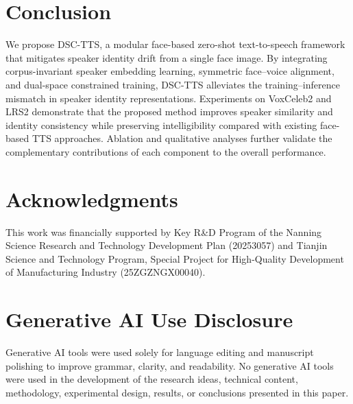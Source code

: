 \documentclass[cameraready]{Interspeech}
\begin{document}
\section{Conclusion}

We propose DSC-TTS, a modular face-based zero-shot text-to-speech framework that mitigates speaker identity drift from a single face image. By integrating corpus-invariant speaker embedding learning, symmetric face--voice alignment, and dual-space constrained training, DSC-TTS alleviates the training--inference mismatch in speaker identity representations. Experiments on VoxCeleb2 and LRS2 demonstrate that the proposed method improves speaker similarity and identity consistency while preserving intelligibility compared with existing face-based TTS approaches. Ablation and qualitative analyses further validate the complementary contributions of each component to the overall performance.

\section{Acknowledgments}
This work was financially supported by Key R\&D Program of the Nanning Science Research and Technology Development Plan (20253057) and Tianjin Science and Technology Program, Special Project for High-Quality Development of Manufacturing Industry (25ZGZNGX00040).

\section{Generative AI Use Disclosure}
Generative AI tools were used solely for language editing and manuscript polishing to improve grammar, clarity, and readability. No generative AI tools were used in the development of the research ideas, technical content, methodology, experimental design, results, or conclusions presented in this paper.



\end{document}
